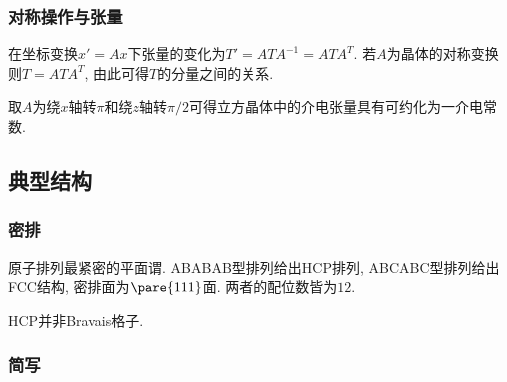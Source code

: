 \documentclass[hidelinks]{ctexart}
\begin{document}

\subsubsection{对称操作与张量} %
\label{ssub:对称操作与张量}

在坐标变换$x' = Ax$下张量的变化为$T' = ATA^{-1} = ATA^T$. 若$A$为晶体的对称变换则$T=ATA^T$, 由此可得$T$的分量之间的关系.
\begin{ex}
    取$A$为绕$x$轴转$\pi$和绕$z$轴转$\pi/2$可得立方晶体中的介电张量具有可约化为一介电常数.
\end{ex}



\subsection{典型结构} %
\label{sub:典型结构}

\subsubsection{密排} %
\label{ssub:密排}

原子排列最紧密的平面谓. ABABAB型排列给出HCP排列, ABCABC型排列给出FCC结构, 密排面为$\pare{111}$面. 两者的配位数皆为$12$.
\begin{pitfall}
    HCP并非Bravais格子.
\end{pitfall}


\subsubsection{简写} %
\label{ssub:简写}
\end{document}
